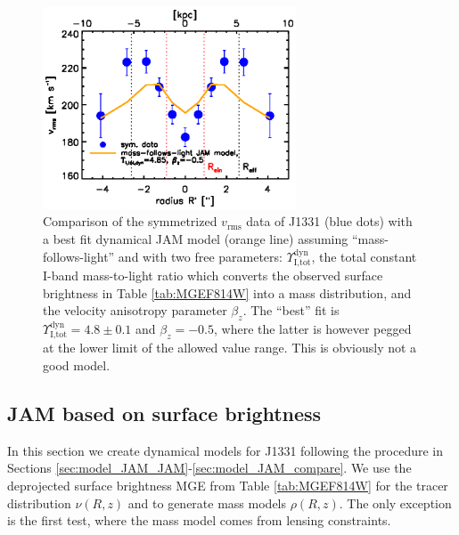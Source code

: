 \documentclass[useAMS,usenatbib]{mnras}
\begin{document}
\begin{figure}
  \centering
  \includegraphics[height=6cm]{jam_A2_vrms.ps}
  \caption{Comparison of the symmetrized $v_\text{rms}$ data of J1331 (blue dots) with a best fit dynamical JAM model (orange line) assuming ``mass-follows-light'' and with two free parameters: $\Upsilon_\text{I,tot}^\text{dyn}$, the total constant I-band mass-to-light ratio which converts the observed surface brightness in Table \ref{tab:MGEF814W} into a mass distribution, and the velocity anisotropy parameter $\beta_z$. The ``best'' fit is $\Upsilon_\text{I,tot}^\text{dyn} = 4.8 \pm 0.1$ and $\beta_z = -0.5$, where the latter is however pegged at the lower limit of the allowed value range. This is obviously not a good model.}
  \label{fig:JAM_modelA2}
\end{figure}

\subsection{JAM based on surface brightness} \label{sec:results_JAM_SB}

In this section we create dynamical models for J1331 following the procedure in Sections \ref{sec:model_JAM_JAM}-\ref{sec:model_JAM_compare}. We use the deprojected surface brightness MGE from Table \ref{tab:MGEF814W} for the tracer distribution $\nu(R,z)$ and to generate mass models $\rho(R,z)$. The only exception is the first test, where the mass model comes from lensing constraints.
\end{document}
